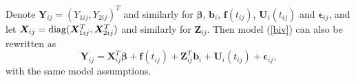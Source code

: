 \documentclass[article,lineno]{biometrika}
\begin{document}
Denote $\bm Y_{ij} = (Y_{1ij}, Y_{2ij})^T$ and similarly for $\bm \beta$, $\bm b_i$, $\bm f(t_{ij})$, $\bm U_i(t_{ij})$ and $\bm \epsilon_{ij}$, and let $\bm X_{ij} = {\rm diag} (\bm X_{1ij}^T, \bm X_{2ij}^T)$ and similarly for $\bm Z_{ij}$. 
Then  model (\ref{biv}) can also be rewritten as 
\begin{equation} \label{biv2}
\boldsymbol Y_{ij} 
=
\boldsymbol X_{ij}^T\boldsymbol{\beta} +
\boldsymbol f(t_{ij}) + \boldsymbol Z_{ij}^T
\boldsymbol b_{i} + 
\boldsymbol U_{i}(t_{ij}) + 
\boldsymbol \epsilon_{ij},
\end{equation}
with the same model assumptions. 
\end{document}
